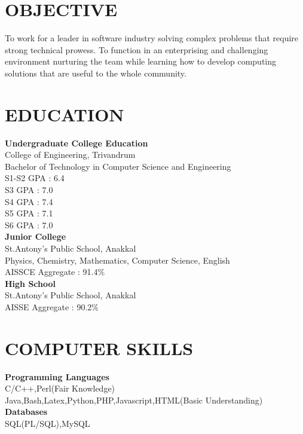 \documentclass[line,margin]{res}
\begin{document}


\address{joji\_antony@gmx.com}
\address{+91 98092 28749}

\begin{resume}
\section{OBJECTIVE}
To work for a leader in software industry solving complex problems that require strong technical prowess. To function in an enterprising and challenging environment nurturing the team while learning how to develop computing solutions that are useful to the whole community.

\section{EDUCATION}

{\bf Undergraduate College Education}\\
College of Engineering, Trivandrum\\
Bachelor of Technology in Computer Science and Engineering\\
S1-S2 GPA : 6.4\\
S3 GPA    : 7.0\\
S4 GPA    : 7.4\\
S5 GPA    : 7.1\\
S6 GPA    : 7.0\\

{\bf Junior College} \\
St.Antony's Public School, Anakkal\\
Physics, Chemistry, Mathematics, Computer Science, English\\
AISSCE Aggregate : 91.4\%\\

{\bf High School} \\
St.Antony's Public School, Anakkal\\
AISSE Aggregate : 90.2\%\\

\section{COMPUTER SKILLS}
{\bf Programming Languages}\\
C/C++,Perl(Fair Knowledge)\\
Java,Bash,Latex,Python,PHP,Javascript,HTML(Basic Understanding)\\
{\bf Databases}\\
SQL(PL/SQL),MySQL\\


\end{resume}
\end{document}
